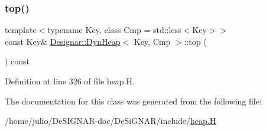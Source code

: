 \subsubsection{\texorpdfstring{top()}{top()}}
{\footnotesize\ttfamily template$<$typename Key, class Cmp = std\+::less$<$\+Key$>$$>$ \\
const Key\& \hyperlink{class_designar_1_1_dyn_heap}{Designar\+::\+Dyn\+Heap}$<$ Key, Cmp $>$\+::top (\begin{DoxyParamCaption}{ }\end{DoxyParamCaption}) const\hspace{0.3cm}{\ttfamily [inline]}}



Definition at line 326 of file heap.\+H.



The documentation for this class was generated from the following file\+:\begin{DoxyCompactItemize}
\item 
/home/julio/\+De\+S\+I\+G\+N\+A\+R-\/doc/\+De\+Si\+G\+N\+A\+R/include/\hyperlink{heap_8_h}{heap.\+H}\end{DoxyCompactItemize}
